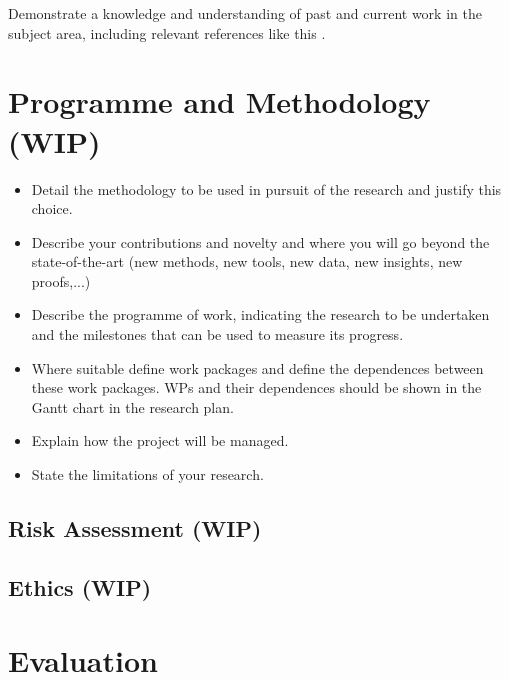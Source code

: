 \documentclass[a4paper,11pt]{article}
\begin{document}
Demonstrate a knowledge and understanding of past and current work in the subject area, including relevant references like this \cite{template}.


\section{Programme and Methodology (WIP)}

\begin{itemize}
    \item Detail the methodology to be used in pursuit of the research and justify this choice.
    \item Describe your contributions and novelty and where you
    will go beyond the state-of-the-art (new methods, new tools,
    new data, new insights, new proofs,...)
    \item Describe the programme of work, indicating the research to be undertaken and the milestones that can be used to measure its progress.
    \item Where suitable define work packages and define the dependences
    between these work packages. WPs and their dependences should be
    shown in the Gantt chart in the research plan.
    \item Explain how the project will be managed.
    \item State the limitations of your research.
\end{itemize}

\subsection{Risk Assessment (WIP)}

\subsection{Ethics (WIP)}


\section{Evaluation}
\end{document}
